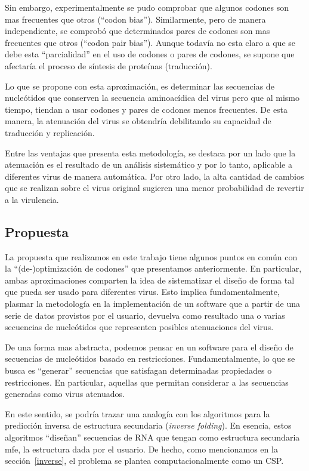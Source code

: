 Sin embargo, experimentalmente se pudo comprobar que algunos codones son mas
frecuentes que otros (``codon bias''). Similarmente, pero de manera
independiente, se comprob\'o que determinados pares de codones son mas
frecuentes que otros (``codon pair bias''). Aunque todav\'ia no esta claro a que
se debe esta ``parcialidad'' en el uso de codones o pares de codones, se supone
que afectar\'ia el proceso de s\'intesis de prote\'inas
(traducci\'on). 

Lo que se propone con esta aproximaci\'on, es determinar las secuencias de
nucle\'otidos que conserven la secuencia aminoac\'idica del virus pero que al
mismo tiempo, tiendan a usar codones y pares de codones menos frecuentes. De
esta manera, la atenuaci\'on del virus se obtendr\'ia debilitando su capacidad
de traducci\'on y replicaci\'on. 

Entre las ventajas que presenta esta metodolog\'ia, se destaca por un lado que
la atenuaci\'on es el resultado de un an\'alisis sistem\'atico y por lo tanto,
aplicable a diferentes virus de manera autom\'atica. Por otro lado, la alta
cantidad de cambios que se realizan sobre el virus original sugieren una menor
probabilidad de revertir a la virulencia.

\subsection{Propuesta}
\label{vacunas-propuesta}

La propuesta que realizamos en este trabajo tiene algunos puntos en com\'un con
la ``(de-)optimizaci\'on de codones'' que presentamos anteriormente. En
particular, ambas aproximaciones comparten la idea de sistematizar el dise\~no
de forma tal que pueda ser usado para diferentes virus. Esto implica
fundamentalmente, plasmar la metodolog\'ia en la implementaci\'on de un software
que a partir de una serie de datos provistos por el usuario, devuelva como
resultado una o varias secuencias de nucle\'otidos que representen posibles
atenuaciones del virus.

De una forma mas abstracta, podemos pensar en un software para el dise\~no de
secuencias de nucle\'otidos basado en restricciones. Fundamentalmente, lo que se
busca es ``generar'' secuencias que satisfagan determinadas propiedades o
restricciones. En particular, aquellas que permitan considerar a las secuencias
generadas como virus atenuados.

En este sentido, se podr\'ia trazar una analog\'ia con los algoritmos para la
predicci\'on inversa de estructura secundaria (\textit{inverse folding}). En
esencia, estos algoritmos ``dise\~nan'' secuencias de \ac{RNA} que tengan como
estructura secundaria \ac{mfe}, la estructura dada por el usuario. De hecho,
como mencionamos en la secci\'on~\ref{inverse}, el problema se plantea
computacionalmente como un \ac{CSP}.

